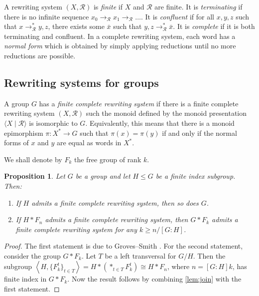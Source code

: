 \documentclass[12pt, a4paper]{amsart}
\newtheorem{proposition}[theorem]{Proposition}
\theoremstyle{definition}
\begin{document}
A rewriting system $(X, \mathcal{R})$ is \emph{finite} if $X$ and $\mathcal{R}$ are finite. It is \emph{terminating} if there is no infinite sequence $x_0\to_{\mathcal{R}}x_1\to_{\mathcal{R}}\ldots$. It is \emph{confluent} if for all $x, y, z$ such that $x\to_{\mathcal{R}}^*y, z$, there exists some $\bar{x}$ such that $y, z\to_{\mathcal{R}}^*\bar{x}$. It is \emph{complete} if it is both terminating and confluent. In a complete rewriting system, each word has a \emph{normal form} which is obtained by simply applying reductions until no more reductions are possible.


\subsection{Rewriting systems for groups}



A group $G$ has a \emph{finite complete rewriting system} if there is a finite complete rewriting system $(X, \mathcal{R})$ such the monoid defined by the monoid presentation  $\langle X \mid \mathcal{R} \rangle$ is isomorphic to $G$. Equivalently, this means that there is a monoid epimorphism $\pi\colon X^*\to G$ such that $\pi(x) = \pi(y)$ if and only if the normal forms of $x$ and $y$ are equal as words in $X^*$.

We shall denote by $F_k$ the free group of rank $k$.

\begin{proposition}
\label{prop:finite_index}
Let $G$ be a group and let $H\leqslant G$ be a finite index subgroup. Then:
\begin{enumerate}
\item If $H$ admits a finite complete rewriting system, then so does $G$.
\item If $H*F_n$ admits a finite complete rewriting system, then $G*F_k$ admits a finite complete rewriting system for any $k\geqslant n/[G:H]$.
\end{enumerate}
\end{proposition}

\begin{proof}
The first statement is due to Groves--Smith \cite{Groves1993}. For the second statement, consider the group $G*F_k$. Let $T$ be a left transversal for $G/H$. Then the subgroup $\left\langle H, \{F_k^t\}_{t\in T}\right\rangle = H*(*_{t\in T}F_k^t)\cong H*F_n$, where $n = [G:H]k$, has finite index in $G*F_k$. Now the result follows by combining \cref{lem:join} with the first statement.
\end{proof}
\end{document}
